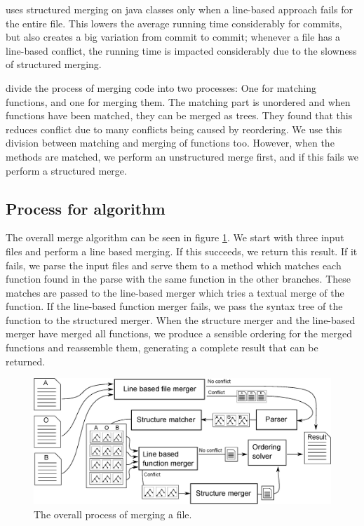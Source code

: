 \documentclass[11pt]{article}
\begin{document}
\citet{Olav} uses structured merging on java classes only when a line-based approach fails for the entire file. This lowers the average running time considerably for commits, but also creates a big variation from commit to commit; whenever a file has a line-based conflict, the running time is impacted considerably due to the slowness of structured merging.

\citet{Apel} divide the process of merging code into two processes: One for matching functions, and one for merging them. The matching part is unordered and when functions have been matched, they can be merged as trees. They found that this reduces conflict due to many conflicts being caused by reordering. We use this division between matching and merging of functions too. However, when the methods are matched, we perform an unstructured merge first, and if this fails we perform a structured merge.

\subsection{Process for algorithm}
The overall merge algorithm can be seen in figure \ref{OverallMergingProcess}. We start with three input files and perform a line based merging. If this succeeds, we return this result. If it fails, we parse the input files and serve them to a method which matches each function found in the parse with the same function in the other branches. These matches are passed to the line-based merger which tries a textual merge of the function. If the line-based function merger fails, we pass the syntax tree of the function to the structured merger. When the structure merger and the line-based merger have merged all functions, we produce a sensible ordering for the merged functions and reassemble them, generating a complete result that can be returned.

\begin{figure}
   \centerline{\includegraphics[scale=0.55]{drawings/eps/overallmergingprocess.eps}}
   \caption{The overall process of merging a file.}
   \label{OverallMergingProcess}
\end{figure}
\end{document}

